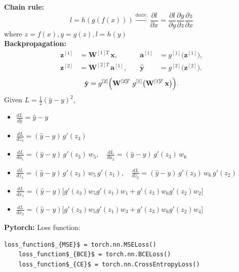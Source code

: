 \documentclass[8pt,twocolumn]{article}
\begin{document}
\textbf{Chain rule:}
\[l = h(g(f(x))) \xrightarrow{\text{deriv.}} \frac{\partial l}{\partial x} 
= \frac{\partial l}{\partial y}\frac{\partial y}{\partial z}\frac{\partial z}{\partial x}\]
where $z = f(x), y = g(z), l = h(y)$\\
\textbf{Backpropagation:}
\[
\begin{aligned}
\mathbf{z}^{[1]} &= \mathbf{W}^{[1]\!T}\,\mathbf{x}, 
&\quad
\mathbf{a}^{[1]} &= g^{[1]}\bigl(\mathbf{z}^{[1]}\bigr),\\
\mathbf{z}^{[2]} &= \mathbf{W}^{[2]\!T}\,\mathbf{a}^{[1]}, 
&\quad
\hat{\mathbf{y}} &= g^{[2]}\bigl(\mathbf{z}^{[2]}\bigr).
\end{aligned}
\]
\[
\hat{\mathbf{y}}
= g^{[2]}\Bigl(\mathbf{W}^{[2]\!T}\;g^{[1]}\bigl(\mathbf{W}^{[1]\!T}\,\mathbf{x}\bigr)\Bigr).
\]
Given $L = \frac{1}{2}(\hat{y} - y)^2$, \vspace{-0.6em}
\begin{itemize}
    \setlength{\itemsep}{0pt}
    \setlength{\parskip}{0pt}
    \item $\frac{dL}{d\hat y} = \hat y - y$
    \item $\frac{dL}{dz_3} = (\hat y - y)\,g'(z_3)$
    \item $\frac{dL}{da_1} = (\hat y - y)\,g'(z_3)\,w_5,\quad
                    \frac{dL}{da_2} = (\hat y - y)\,g'(z_3)\,w_6$
    \item $\frac{dL}{dz_1} = (\hat y - y)\,g'(z_3)\,w_5\,g'(z_1),\quad
                    \frac{dL}{dz_2} = (\hat y - y)\,g'(z_3)\,w_6\,g'(z_2)$
    \item $\frac{dL}{dx_1} = (\hat y - y)\bigl[g'(z_3)w_5g'(z_1)w_1 + g'(z_3)w_6g'(z_2)w_2\bigr]$
    \item $\frac{dL}{dx_2} = (\hat y - y)\bigl[g'(z_3)w_5g'(z_1)w_3 + g'(z_3)w_6g'(z_2)w_4\bigr]$
  \end{itemize}
\textbf{Pytorch:}\vspace{-0.6em}
Loss function:
\begin{lstlisting}[mathescape = true]
    loss_function$_{MSE}$ = torch.nn.MSELoss() 
    loss_function$_{BCE}$ = torch.nn.BCELoss() 
    loss_function$_{CE}$ = torch.nn.CrossEntropyLoss()
\end{lstlisting}\vspace{-0.6em}
\end{document}
